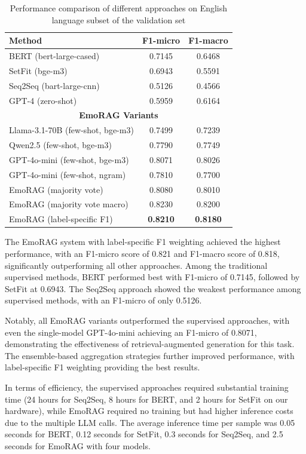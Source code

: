 \documentclass[a4paper,12pt]{extarticle}
\begin{document}
\begin{table}[h]
\centering
\begin{tabular}{lcc}
\toprule
\textbf{Method} & \textbf{F1-micro} & \textbf{F1-macro} \\
\midrule
BERT (bert-large-cased) & 0.7145 & 0.6468 \\
SetFit (bge-m3) & 0.6943 & 0.5591 \\
Seq2Seq (bart-large-cnn) & 0.5126 & 0.4566 \\
GPT-4 (zero-shot) & 0.5959 & 0.6164 \\
\midrule
\multicolumn{3}{c}{\textbf{EmoRAG Variants}} \\
\midrule
Llama-3.1-70B (few-shot, bge-m3) & 0.7499 & 0.7239 \\
Qwen2.5 (few-shot, bge-m3) & 0.7790 & 0.7749 \\
GPT-4o-mini (few-shot, bge-m3) & 0.8071 & 0.8026 \\
GPT-4o-mini (few-shot, ngram) & 0.7810 & 0.7700 \\
EmoRAG (majority vote) & 0.8080 & 0.8010 \\
EmoRAG (majority vote macro) & 0.8230 & 0.8200 \\
EmoRAG (label-specific F1) & \textbf{0.8210} & \textbf{0.8180} \\
\bottomrule
\end{tabular}
\caption{Performance comparison of different approaches on English language subset of the validation set}
\label{tab:english_comparison}
\end{table}

The EmoRAG system with label-specific F1 weighting achieved the highest performance, with an F1-micro score of 0.821 and F1-macro score of 0.818, significantly outperforming all other approaches. Among the traditional supervised methods, BERT performed best with F1-micro of 0.7145, followed by SetFit at 0.6943. The Seq2Seq approach showed the weakest performance among supervised methods, with an F1-micro of only 0.5126.

Notably, all EmoRAG variants outperformed the supervised approaches, with even the single-model GPT-4o-mini achieving an F1-micro of 0.8071, demonstrating the effectiveness of retrieval-augmented generation for this task. The ensemble-based aggregation strategies further improved performance, with label-specific F1 weighting providing the best results.

In terms of efficiency, the supervised approaches required substantial training time (24 hours for Seq2Seq, 8 hours for BERT, and 2 hours for SetFit on our hardware), while EmoRAG required no training but had higher inference costs due to the multiple LLM calls. The average inference time per sample was 0.05 seconds for BERT, 0.12 seconds for SetFit, 0.3 seconds for Seq2Seq, and 2.5 seconds for EmoRAG with four models.
\end{document}
